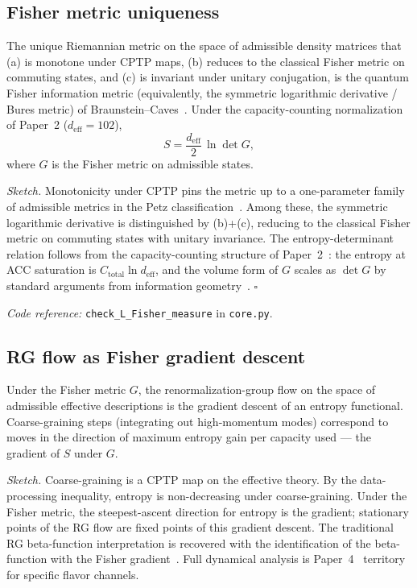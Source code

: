 \documentclass[11pt]{article}
\theoremstyle{remark}
\newcommand{\coderef}[2]{\smallskip\noindent\textit{Code reference:} \texttt{#1} in \texttt{#2}.}
\begin{document}
\subsection{Fisher metric uniqueness}

\begin{tcolorbox}[apfbox, title={Lemma 7.1 ($L_{\mathrm{Fisher}}$)}]
The unique Riemannian metric on the space of admissible density matrices
that (a) is monotone under CPTP maps, (b) reduces to the classical Fisher
metric on commuting states, and (c) is invariant under unitary conjugation,
is the quantum Fisher information metric (equivalently, the symmetric
logarithmic derivative / Bures metric) of Braunstein--Caves~\cite{BraunsteinCaves1994}.
Under the capacity-counting normalization of Paper~2 ($d_{\mathrm{eff}} = 102$),
\[
S = \frac{d_{\mathrm{eff}}}{2}\,\ln\det G,
\]
where $G$ is the Fisher metric on admissible states.
\end{tcolorbox}

\textit{Sketch.}  Monotonicity under CPTP pins the metric up to a one-parameter
family of admissible metrics in the Petz classification~\cite{Petz1996}.
Among these, the symmetric logarithmic derivative is distinguished by
(b)+(c), reducing to the classical Fisher metric on commuting states with
unitary invariance.  The entropy-determinant relation follows from the
capacity-counting structure of Paper~2~\cite{Paper2}: the entropy at
ACC saturation is $C_{\mathrm{total}} \ln d_{\mathrm{eff}}$, and the
volume form of $G$ scales as $\det G$ by standard arguments from
information geometry~\cite{AmariNagaoka2000}.  \hfill$\square$

\coderef{check\_L\_Fisher\_measure}{core.py}

\subsection{RG flow as Fisher gradient descent}

\begin{tcolorbox}[apfbox, title={Proposition 7.2 (RG flow as Fisher descent)}]
Under the Fisher metric $G$, the renormalization-group flow on the space
of admissible effective descriptions is the gradient descent of an entropy
functional.  Coarse-graining steps (integrating out high-momentum modes)
correspond to moves in the direction of maximum entropy gain per capacity
used --- the gradient of $S$ under $G$.
\end{tcolorbox}

\noindent\textit{Sketch.}  Coarse-graining is a CPTP map on the effective
theory.  By the data-processing inequality, entropy is non-decreasing under
coarse-graining.  Under the Fisher metric, the steepest-ascent direction for
entropy is the gradient; stationary points of the RG flow are fixed points
of this gradient descent.  The traditional RG beta-function interpretation
is recovered with the identification of the beta-function with the Fisher
gradient~\cite{AmariNagaoka2000}.  Full dynamical analysis is
Paper~4~\cite{Paper4} territory for specific flavor channels.
\end{document}
